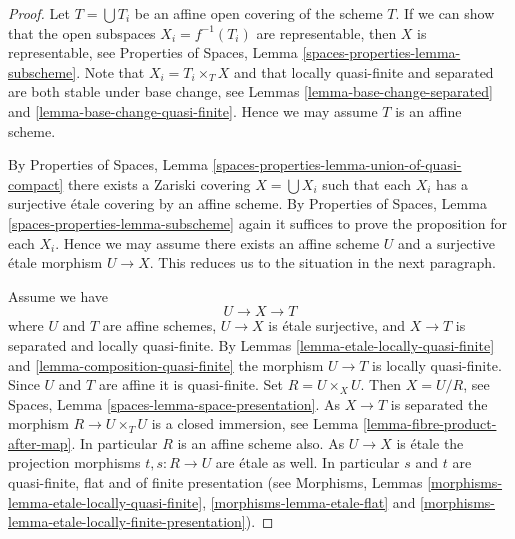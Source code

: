 \documentclass{stacks-project}
\theoremstyle{plain}
\theoremstyle{definition}
\theoremstyle{remark}
\numberwithin{equation}{subsection}
\begin{document}
\begin{proof}
Let $T = \bigcup T_i$ be an affine open covering of the scheme $T$.
If we can show that the open subspaces $X_i = f^{-1}(T_i)$ are
representable, then $X$ is representable, see
Properties of Spaces, Lemma \ref{spaces-properties-lemma-subscheme}.
Note that $X_i = T_i \times_T X$ and that locally quasi-finite and
separated are both stable under base change, see
Lemmas \ref{lemma-base-change-separated} and
\ref{lemma-base-change-quasi-finite}.
Hence we may assume $T$ is an affine scheme.

\medskip\noindent
By
Properties of Spaces,
Lemma \ref{spaces-properties-lemma-union-of-quasi-compact}
there exists a Zariski covering $X = \bigcup X_i$
such that each $X_i$ has a surjective \'etale covering by
an affine scheme. By
Properties of Spaces, Lemma \ref{spaces-properties-lemma-subscheme}
again it suffices to prove the proposition for each $X_i$.
Hence we may assume there exists an affine scheme $U$ and a
surjective \'etale morphism $U \to X$. This reduces us to the
situation in the next paragraph.

\medskip\noindent
Assume we have
$$
U \longrightarrow X \longrightarrow T
$$
where $U$ and $T$ are affine schemes, $U \to X$ is \'etale surjective, and
$X \to T$ is separated and locally quasi-finite. By
Lemmas \ref{lemma-etale-locally-quasi-finite} and
\ref{lemma-composition-quasi-finite}
the morphism $U \to T$ is locally quasi-finite.
Since $U$ and $T$ are affine it is quasi-finite.
Set $R = U \times_X U$. Then $X = U/R$, see
Spaces, Lemma \ref{spaces-lemma-space-presentation}.
As $X \to T$ is separated the
morphism $R \to U \times_T U$ is a closed immersion, see
Lemma \ref{lemma-fibre-product-after-map}.
In particular $R$ is an affine scheme also.
As $U \to X$ is \'etale the projection morphisms
$t, s : R \to U$ are \'etale as well. In particular $s$ and $t$ are
quasi-finite, flat and of finite presentation (see
Morphisms, Lemmas \ref{morphisms-lemma-etale-locally-quasi-finite},
\ref{morphisms-lemma-etale-flat} and
\ref{morphisms-lemma-etale-locally-finite-presentation}).


\end{proof}
\end{document}
